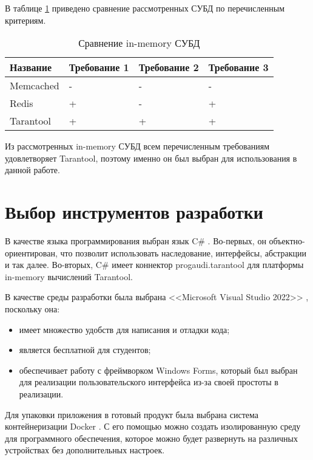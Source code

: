 В таблице \ref{tbl:imdb} приведено сравнение рассмотренных СУБД по перечисленным критериям.

\captionsetup{justification=raggedleft,singlelinecheck=off}
\begin{table}[H]
	\centering
	\caption{Сравнение in-memory СУБД}
	\label{tbl:imdb}
	\begin{tabular}{|l|l|l|l|} 
	\hline
	Название  & Требование 1 & Требование 2 & Требование 3  \\ 
	\hline
	Memcached & -            & -            & -             \\ 
	\hline
	Redis     & +            & -            & +             \\ 
	\hline
	Tarantool & +            & +            & +             \\
	\hline
\end{tabular}
\end{table}


Из рассмотренных in-memory СУБД всем перечисленным требованиям удовлетворяет Tarantool, поэтому именно он был выбран для использования в данной работе.




\section{Выбор инструментов разработки}

В качестве языка программирования выбран язык C\# \cite{sharp}. Во-первых, он объектно-ориентирован, что позволит использовать наследование, интерфейсы, абстракции и так далее. Во-вторых, C\# имеет коннектор progaudi.tarantool \cite{connector} для платформы in-memory вычислений Tarantool.


В качестве среды разработки была выбрана <<Microsoft Visual Studio 2022>> \cite{vs}, поскольку она:
\begin{itemize}
	\item[1)] имеет множество удобств для написания и отладки кода;
	\item[2)] является бесплатной для студентов;
	\item[3)] обеспечивает работу с фреймворком Windows Forms\cite{wf}, который был выбран для реализации пользовательского интерфейса из-за своей простоты в реализации.  
\end{itemize}

Для упаковки приложения в готовый продукт была выбрана система контейнеризации Docker \cite{docker}. С его помощью можно создать изолированную среду для программного обеспечения, которое можно будет развернуть на различных устройствах без дополнительных настроек.

